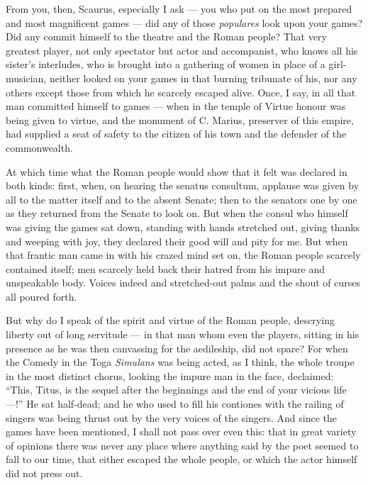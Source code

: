  From you, then, Scaurus, especially I ask --- you who put on the most prepared and most magnificent games --- did any of those \textit{populares} look upon your games? Did any commit himself to the theatre and the Roman people? That very greatest player, not only spectator but actor and accompanist, who knows all his sister's interludes, who is brought into a gathering of women in place of a girl-musician, neither looked on your games in that burning tribunate of his, nor any others except those from which he scarcely escaped alive. Once, I say, in all that man committed himself to games --- when in the temple of Virtue honour was being given to virtue, and the monument of C. Marius, preserver of this empire, had supplied a seat of safety to the citizen of his town and the defender of the commonwealth.

 At which time what the Roman people would show that it felt was declared in both kinds: first, when, on hearing the senatus consultum, applause was given by all to the matter itself and to the absent Senate; then to the senators one by one as they returned from the Senate to look on. But when the consul who himself was giving the games sat down, standing with hands stretched out, giving thanks and weeping with joy, they declared their good will and pity for me. But when that frantic man came in with his crazed mind set on, the Roman people scarcely contained itself; men scarcely held back their hatred from his impure and unspeakable body. Voices indeed and stretched-out palms and the shout of curses all poured forth.

 But why do I speak of the spirit and virtue of the Roman people, descrying liberty out of long servitude --- in that man whom even the players, sitting in his presence as he was then canvassing for the aedileship, did not spare? For when the Comedy in the Toga \textit{Simulans} was being acted, as I think, the whole troupe in the most distinct chorus, looking the impure man in the face, declaimed: ``This, Titus, is the sequel after the beginnings and the end of your vicious life ---!'' He sat half-dead; and he who used to fill his contiones with the railing of singers was being thrust out by the very voices of the singers. And since the games have been mentioned, I shall not pass over even this: that in great variety of opinions there was never any place where anything said by the poet seemed to fall to our time, that either escaped the whole people, or which the actor himself did not press out.

